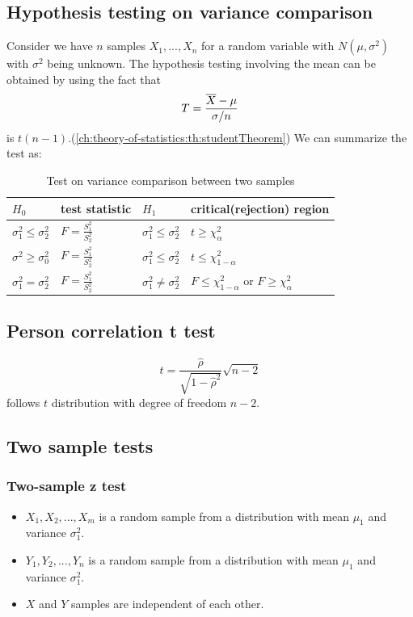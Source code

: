 \begin{refsection}
\subsection{Hypothesis testing on variance comparison}
Consider we have $n$ samples $X_1,...,X_n$ for a random variable with $N(\mu,\sigma^2)$ with $\sigma^2$ being unknown. The hypothesis testing involving the mean can be obtained by using the fact that $$T = \frac{\overline{X} - \mu}{\sigma/n}$$ is $t(n-1)$.(\autoref{ch:theory-of-statistics:th:studentTheorem}) We can summarize the test as:
\begin{table}[H]
	\centering
	\caption{Test on variance comparison between two samples }
	\begin{tabular}{|l|l|l|l|}
		\hline
		$H_0$	& test statistic  & $H_1$ & critical(rejection) region \\ \hline
		$\sigma_1^2 \leq \sigma_2^2$ &$F = \frac{S^2_1}{S^2_2}$ & $\sigma_1^2 \leq \sigma_2^2$
		&  $t \geq \chi^2_{\alpha}$ \\ \hline
		$\sigma^2 \geq \sigma_0^2$ & $F = \frac{S^2_1}{S^2_2}$ & $\sigma_1^2 \leq \sigma_2^2$
		& $t\leq \chi^2_{1-\alpha}$ \\ \hline
		$\sigma_1^2 = \sigma_2^2$ &  $F = \frac{S^2_1}{S^2_2}$ & $\sigma_1^2 \neq \sigma_2^2$
		&  $F\leq \chi^2_{1-\alpha}$ or $F \geq \chi^2_{\alpha}$\\ \hline
	\end{tabular}
\end{table}

\subsection{Person correlation t test}



\begin{lemma}
	
	$$t = \frac{\hat{\rho}}{\sqrt{1-\hat{\rho}^2}}\sqrt{n-2}$$
follows $t$ distribution with degree of freedom $n-2$.	
	
	
\end{lemma}

\subsection{Two sample tests}

\subsubsection{Two-sample z test}
\begin{note}\hfill
\begin{itemize}
	\item $X_1,X_2,...,X_m$ is a random sample from a distribution with mean $\mu_1$ and variance $\sigma_1^2$.
	\item $Y_1,Y_2,...,Y_n$ is a random sample from a distribution with mean $\mu_1$ and variance $\sigma_1^2$.
	\item $X$ and $Y$ samples are independent of each other. 
\end{itemize}	
\end{note}



\end{refsection}
